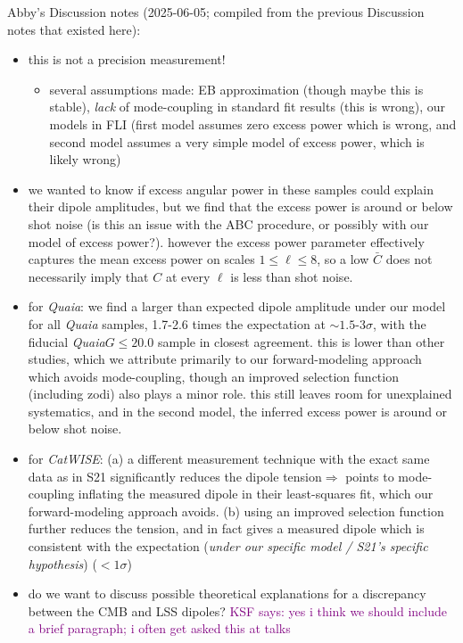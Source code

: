 \documentclass[modern]{aastex631}
\newcommand{\ksf}[1]{\textcolor{purple}{KSF says: #1}}
\newcommand{\catwise}{\textsl{CatWISE}\xspace}
\newcommand{\quaia}{\textsl{Quaia}\xspace}
\begin{document}
Abby's Discussion notes (2025-06-05; compiled from the previous Discussion notes that existed here):
\begin{itemize}
    \item this is not a precision measurement!
    \begin{itemize}
        \item several assumptions made: EB approximation (though maybe this is stable), \textit{lack} of mode-coupling in standard fit results (this is wrong), our models in FLI (first model assumes zero excess power which is wrong, and second model assumes a very simple model of excess power, which is likely wrong)
    \end{itemize}
    \item we wanted to know if excess angular power in these samples could explain their dipole amplitudes, but we find that the excess power is around or below shot noise (is this an issue with the ABC procedure, or possibly with our model of excess power?). however the excess power parameter effectively captures the mean excess power on scales $1\le\ell\le 8$, so a low $\bar C$ does not necessarily imply that $C$ at every $\ell$ is less than shot noise.
    \item for \quaia: we find a larger than expected dipole amplitude under our model for all \quaia samples, 1.7-2.6 times the expectation at $\sim 1.5$-3$\sigma$, with the fiducial \quaia $G\le 20.0$ sample in closest agreement. this is lower than other studies, which we attribute primarily to our forward-modeling approach which avoids mode-coupling, though an improved selection function (including zodi) also plays a minor role. this still leaves room for unexplained systematics, and in the second model, the inferred excess power is around or below shot noise.
    \item for \catwise: (a) a different measurement technique with the exact same data as in S21 significantly reduces the dipole tension$\Rightarrow$ points to mode-coupling inflating the measured dipole in their least-squares fit, which our forward-modeling approach avoids. (b) using an improved selection function further reduces the tension, and in fact gives a measured dipole which is consistent with the expectation (\textit{under our specific model / S21's specific hypothesis}) ($<1\sigma$)
    \item do we want to discuss possible theoretical explanations for a discrepancy between the CMB and LSS dipoles? \citep{han_qcd_2023, ghosh_probing_2023} \ksf{yes i think we should include a brief paragraph; i often get asked this at talks}
\end{itemize}
\end{document}
